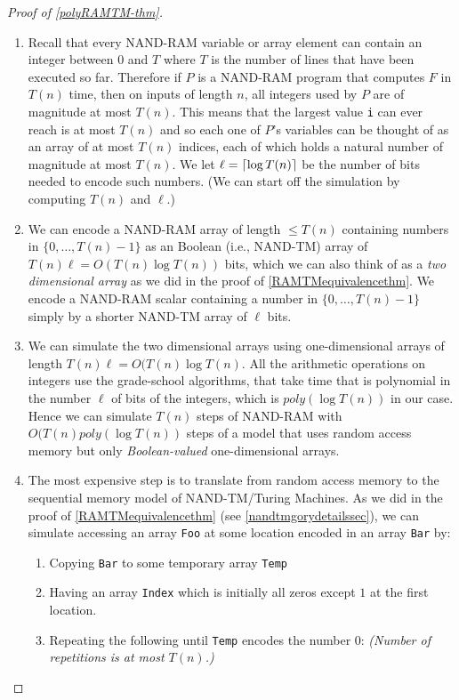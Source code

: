 \begin{proof}[Proof of \cref{polyRAMTM-thm}]
\begin{enumerate}
\def\labelenumi{\arabic{enumi}.}
\item
  Recall that every NAND-RAM variable or array element can contain an
  integer between \(0\) and \(T\) where \(T\) is the number of lines
  that have been executed so far. Therefore if \(P\) is a NAND-RAM
  program that computes \(F\) in \(T(n)\) time, then on inputs of length
  \(n\), all integers used by \(P\) are of magnitude at most \(T(n)\).
  This means that the largest value \texttt{i} can ever reach is at most
  \(T(n)\) and so each one of \(P\)'s variables can be thought of as an
  array of at most \(T(n)\) indices, each of which holds a natural
  number of magnitude at most \(T(n)\). We let
  \(\ell = \lceil \log T(n) \rceil\) be the number of bits needed to encode
  such numbers. (We can start off the simulation by computing \(T(n)\)
  and \(\ell\).)
\item
  We can encode a NAND-RAM array of length \(\leq T(n)\) containing
  numbers in \(\{0,\ldots, T(n)-1 \}\) as an Boolean (i.e., NAND-TM)
  array of \(T(n)\ell =O(T(n)\log T(n))\) bits, which we can also think
  of as a \emph{two dimensional array} as we did in the proof of
  \cref{RAMTMequivalencethm}. We encode a NAND-RAM scalar containing a
  number in \(\{0,\ldots, T(n)-1 \}\) simply by a shorter NAND-TM array
  of \(\ell\) bits.
\item
  We can simulate the two dimensional arrays using one-dimensional
  arrays of length \(T(n)\ell = O(T(n) \log T(n)\). All the arithmetic
  operations on integers use the grade-school algorithms, that take time
  that is polynomial in the number \(\ell\) of bits of the integers,
  which is \(poly(\log T(n))\) in our case. Hence we can simulate
  \(T(n)\) steps of NAND-RAM with \(O(T(n)poly(\log T(n))\) steps of a
  model that uses random access memory but only \emph{Boolean-valued}
  one-dimensional arrays.
\item
  The most expensive step is to translate from random access memory to
  the sequential memory model of NAND-TM/Turing Machines. As we did in
  the proof of \cref{RAMTMequivalencethm} (see
  \cref{nandtmgorydetailssec}), we can simulate accessing an array
  \texttt{Foo} at some location encoded in an array \texttt{Bar} by:

  \begin{enumerate}
  \def\labelenumii{\alph{enumii}.}
  \tightlist
  \item
    Copying \texttt{Bar} to some temporary array \texttt{Temp}
  \item
    Having an array \texttt{Index} which is initially all zeros except
    \(1\) at the first location.
  \item
    Repeating the following until \texttt{Temp} encodes the number
    \(0\): \emph{(Number of repetitions is at most \(T(n)\).)}


\end{enumerate}
\end{enumerate}
\end{proof}
